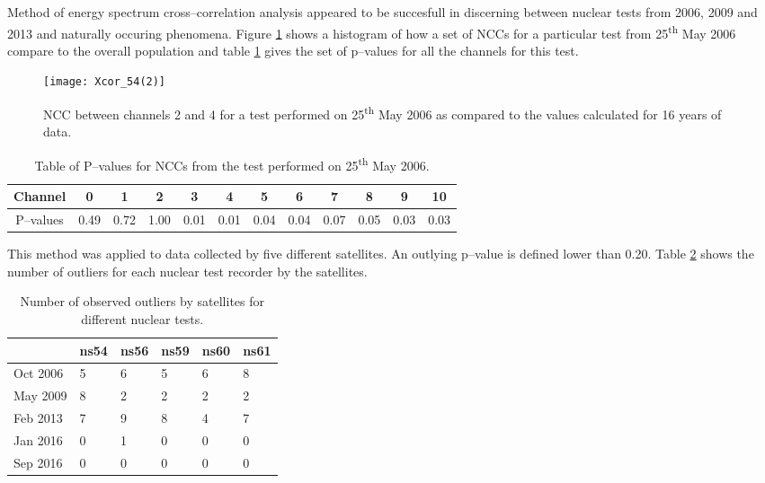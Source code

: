 \documentclass[twocolumn,prl,nobalancelastpage,aps,10pt,floatfix]{revtex4-1}
\begin{document}
Method of energy spectrum cross--correlation analysis appeared to be succesfull in discerning between nuclear tests from 2006, 2009 and 2013 and naturally occuring phenomena. Figure \ref{Xcor} shows a histogram of how a set of NCCs for a particular test from 25\textsuperscript{th} May 2006 compare to the overall population and table \ref{pv} gives the set of p--values for all the channels for this test.
\begin{figure}
	\texttt{[image: Xcor\_54(2)]} 
	\caption{NCC between channels 2 and 4 for a test performed on 25\textsuperscript{th} May 2006 as compared to the values calculated for 16 years of data.}\label{Xcor} 
\end{figure}
 \begin{table}
 	\begin{tabular}{|c|c|c|c|c|c|c|c|c|c|c|c|}
 		\hline
 		Channel & 0 & 1 & 2 & 3 & 4 & 5 & 6 & 7 & 8 & 9 & 10  \\
 		\hline
 		P--values & 0.49 & 0.72 & 1.00 & 0.01 & 0.01 & 0.04 & 0.04 & 0.07 & 0.05 & 0.03 & 0.03\\
 		\hline	
 	\end{tabular}
 \caption{Table of P--values for NCCs from the test performed on 25\textsuperscript{th} May 2006.}\label{pv} 
 \end{table}

This method was applied to data collected by five different satellites. An outlying p--value is defined lower than 0.20. Table \ref{Xsat} shows the number of outliers for each nuclear test recorder by the satellites.

\begin{table}[]
	\centering
	\caption{Number of observed outliers by satellites for different nuclear tests.}\label{Xsat}
	\begin{tabular}{l|l|l|l|l|l|}
		\cline{2-6}
		& ns54 & ns56 & ns59 & ns60 & ns61  \\ \hline
		\multicolumn{1}{|l|}{Oct 2006} & 5 & 6 & 5 & 6 & 8 \\ \hline
		\multicolumn{1}{|l|}{May 2009} & 8 & 2 & 2 & 2 & 2 \\ \hline
		\multicolumn{1}{|l|}{Feb 2013} & 7 & 9 & 8 & 4 & 7 \\ \hline
		\multicolumn{1}{|l|}{Jan 2016} & 0 & 1 & 0 & 0 & 0 \\ \hline
		\multicolumn{1}{|l|}{Sep 2016} & 0 & 0 & 0 & 0 & 0 \\ \hline
	\end{tabular}
\end{table}
\end{document}
